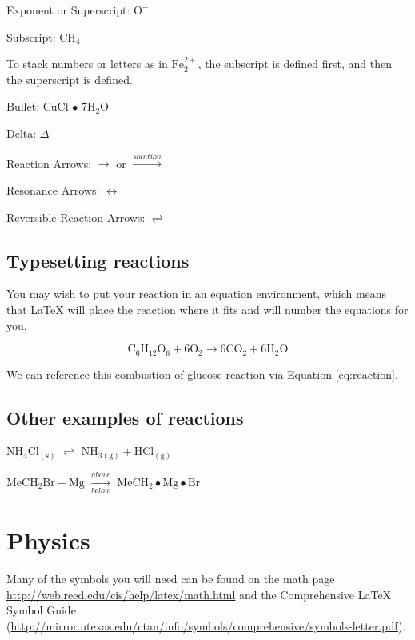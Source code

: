 \documentclass[12pt,twoside]{reedthesis}
\begin{document}
  \noindent Exponent or Superscript: \(\mathrm{O^-}\)
  
  \noindent Subscript: \(\mathrm{CH_4}\)
  
  To stack numbers or letters as in \(\mathrm{Fe_2^{2+}}\), the subscript
  is defined first, and then the superscript is defined.
  
  \noindent Bullet: CuCl \(\bullet\) \(\mathrm{7H_{2}O}\)
  
  \noindent Delta: \(\Delta\)
  
  \noindent Reaction Arrows: \(\longrightarrow\) or
  \(\xrightarrow{solution}\)
  
  \noindent Resonance Arrows: \(\leftrightarrow\)
  
  \noindent Reversible Reaction Arrows: \(\rightleftharpoons\)
  
  \subsection{Typesetting reactions}\label{typesetting-reactions}
  
  You may wish to put your reaction in an equation environment, which
  means that LaTeX will place the reaction where it fits and will number
  the equations for you.
  
  \begin{equation}
    \mathrm{C_6H_{12}O_6  + 6O_2} \longrightarrow \mathrm{6CO_2 + 6H_2O}
    \label{eq:reaction}
  \end{equation}
  
  We can reference this combustion of glucose reaction via Equation
  \ref{eq:reaction}.
  
  \subsection{Other examples of
  reactions}\label{other-examples-of-reactions}
  
  \(\mathrm{NH_4Cl_{(s)}}\) \(\rightleftharpoons\)
  \(\mathrm{NH_{3(g)}+HCl_{(g)}}\)
  
  \noindent \(\mathrm{MeCH_2Br + Mg}\) \(\xrightarrow[below]{above}\)
  \(\mathrm{MeCH_2\bullet Mg \bullet Br}\)
  
  \section{Physics}\label{physics}
  
  Many of the symbols you will need can be found on the math page
  \url{http://web.reed.edu/cis/help/latex/math.html} and the Comprehensive
  LaTeX Symbol Guide
  (\url{http://mirror.utexas.edu/ctan/info/symbols/comprehensive/symbols-letter.pdf}).
  
\end{document}

